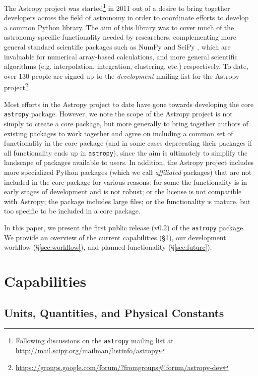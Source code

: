 \documentclass[traditabstract]{aa}
\newcommand{\astropy}{\texttt{astropy}\xspace}
\begin{document}
The Astropy project was started\footnote{Following discussions on
the \texttt{astropy} mailing list at
\url{http://mail.scipy.org/mailman/listinfo/astropy}} in 2011 out of a desire
to bring together developers across the field of astronomy in order to
coordinate efforts to develop a common Python library. The aim of this library
was to cover much of the astronomy-specific functionality needed by
researchers, complementing more general standard scientific packages such as
NumPy \citep{oliphant2006guide,van2011numpy} and SciPy \citep{jones2001scipy},
which are invaluable for numerical array-based calculations, and more general
scientific algorithms (e.g. interpolation, integration, clustering, etc.)
respectively. To date, over 130 people are signed up to the
\textit{development} mailing list for the Astropy project\footnote{
\url{https://groups.google.com/forum/?fromgroups\#!forum/astropy-dev}}.

Most efforts in the Astropy project to date have gone towards developing the
core \astropy package. However, we note the scope of the Astropy project is
not simply to create a core package, but more generally to bring together
authors of existing packages to work together and agree on including a common
set of functionality in the core package (and in some cases deprecating their
packages if all functionality ends up in \astropy), since the aim is
ultimately to simplify the landscape of packages available to users. In
addition, the Astropy project includes more specialized Python packages (which
we call \textit{affiliated} packages) that are not included in the core
package for various reasons: for some the functionality is in early stages of
development and is not robust; or the license is not compatible with Astropy;
the package includes large files; or the functionality is mature, but too
specific to be included in a core package.

In this paper, we present the first public release (v0.2) of the \astropy
package. We provide an overview of the current capabilities
(\S\ref{sec:capabilities}), our development workflow (\S\ref{sec:workflow}),
and planned functionality (\S\ref{sec:future}).


\section{Capabilities}

\label{sec:capabilities}


\subsection{Units, Quantities, and Physical Constants}
\end{document}
